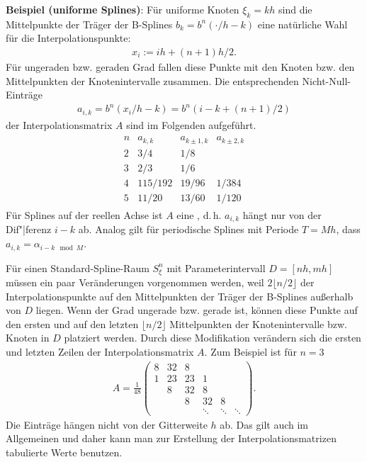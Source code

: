 \textbf{Beispiel (uniforme Splines)}:
Für uniforme Knoten $\xi_k = kh$ sind die Mittelpunkte der Träger der B-Splines
$b_k = b^n(\cdot/h - k)$ eine natürliche Wahl für die Interpolationspunkte:
\begin{align*}
    x_i := ih + (n + 1)h/2.
\end{align*}
Für ungeraden bzw. geraden Grad fallen diese Punkte mit den Knoten bzw. den Mittelpunkten der
Knotenintervalle zusammen.
Die entsprechenden Nicht-Null-Einträge
\begin{align*}
    a_{i,k} = b^n(x_i/h - k) = b^n(i - k + (n + 1)/2)
\end{align*}
der Interpolationsmatrix $A$ sind im Folgenden aufgeführt.
\begin{align*}
    \begin{array}{c|ccc}
        n & a_{k,k} & a_{k \pm 1,k} & a_{k \pm 2,k} \\\hline
        2 & 3/4 & 1/8 &\\
        3 & 2/3 & 1/6 &\\
        4 & 115/192 & 19/96 & 1/384\\
        5 & 11/20 & 13/60 & 1/120
    \end{array}
\end{align*}
Für Splines auf der reellen Achse ist $A$ eine ,
d.\,h. $a_{i,k}$ hängt nur von der Dif"|ferenz $i - k$ ab.
Analog gilt für periodische Splines mit Periode $T = Mh$, dass $a_{i,k} = \alpha_{i - k \mod M}$.

Für einen Standard-Spline-Raum $S_\xi^n$ mit Parameterintervall $D = [nh, mh]$ müssen ein
paar Veränderungen vorgenommen werden, weil $2 \lfloor n/2 \rfloor$ der Interpolationspunkte
auf den Mittelpunkten der Träger der B-Splines außerhalb von $D$ liegen.
Wenn der Grad ungerade bzw. gerade ist, können diese Punkte auf den ersten und auf den letzten
$\lfloor n/2 \rfloor$ Mittelpunkten der Knotenintervalle bzw. Knoten in $D$ platziert werden.
Durch diese Modifikation verändern sich die ersten und letzten Zeilen der Interpolationsmatrix
$A$.
Zum Beispiel ist für $n = 3$
\begin{align*}
    A = \frac{1}{48} \begin{pmatrix}
        8 & 32 & 8 & & &\\
        1 & 23 & 23 & 1 & &\\
        & 8 & 32 & 8 & &\\
        & & 8 & 32 & 8 &\\
        & & & \ddots & \ddots & \ddots
    \end{pmatrix}.
\end{align*}
Die Einträge hängen nicht von der Gitterweite $h$ ab.
Das gilt auch im Allgemeinen und daher kann man zur Erstellung der
Interpolationsmatrizen tabulierte Werte benutzen.

